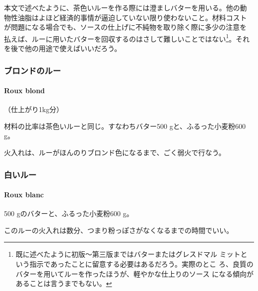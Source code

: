 \begin{recette}
本文で述べたように、茶色いルーを作る際には澄ましバターを用いる。他の動
物性油脂はよほど経済的事情が逼迫していない限り使わないこと。材料コスト
が問題になる場合でも、ソースの仕上げに不純物を取り除く際に多少の注意を
払えば、ルーに用いたバターを回収するのはさして難しいことではない\footnote{既に述べたように初版〜第三版まではバターまたはグレスドマル
  ミットという指示であったことに留意する必要はあるだろう。実際のとこ
  ろ、良質のバターを用いてルーを作ったほうが、軽やかな仕上りのソース
  になる傾向があることは言うまでもない。}。それ
を後で他の用途で使えばいいだろう。

\maeaki

\hypertarget{rouxblond}{%
\subsubsection{ブロンドのルー}\label{rouxblond}}

\hypertarget{roux-blond}{%
\paragraph{Roux blond}\label{roux-blond}}


（仕上がり1kg分）

材料の比率は茶色いルーと同じ。すなわちバター500 gと、ふるった小麦粉600
g。

火入れは、ルーがほんのりブロンド色になるまで、ごく弱火で行なう。

\maeaki

\hypertarget{rouxblanc}{%
\subsubsection{白いルー}\label{rouxblanc}}

\hypertarget{roux-blanc}{%
\paragraph{Roux blanc}\label{roux-blanc}}

 

500 gのバターと、ふるった小麦粉600 g。

このルーの火入れは数分、つまり粉っぽさがなくなるまでの時間でいい。
\end{recette}